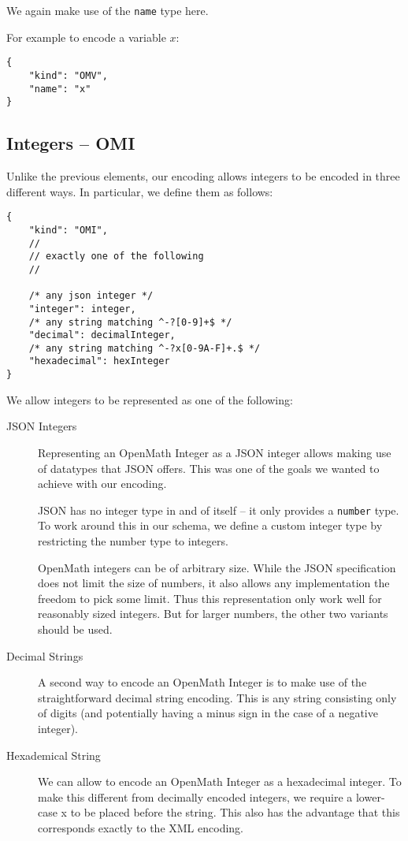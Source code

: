 We again make use of the \texttt{name} type here. 

For example to encode a variable $x$:
\\\begin{minipage}{\linewidth}
\begin{lstlisting}
{
    "kind": "OMV",
    "name": "x"
}
\end{lstlisting}\end{minipage}

\subsection{Integers -- OMI}

Unlike the previous elements, our encoding allows integers to be encoded in three different ways. 
In particular, we define them as follows:
\\\begin{minipage}{\linewidth}
\begin{lstlisting}
{
    "kind": "OMI",
    //
    // exactly one of the following
    //

    /* any json integer */
    "integer": integer,
    /* any string matching ^-?[0-9]+$ */
    "decimal": decimalInteger,
    /* any string matching ^-?x[0-9A-F]+.$ */
    "hexadecimal": hexInteger
}
\end{lstlisting}\end{minipage}

We allow integers to be represented as one of the following:
\begin{description}
    \item[JSON Integers]
    Representing an OpenMath Integer as a JSON integer allows making use of datatypes that JSON offers. 
    This was one of the goals we wanted to achieve with our encoding. 
    
    JSON has no integer type in and of itself -- it only provides a \texttt{number} type. 
    To work around this in our schema, we define a custom integer type by restricting the number type to integers. 

    OpenMath integers can be of arbitrary size. 
    While the JSON specification does not limit the size of numbers, it also allows any implementation the freedom to pick some limit. 
    Thus this representation only work well for reasonably sized integers. 
    But for larger numbers, the other two variants should be used. 

    \item[Decimal Strings]
    A second way to encode an OpenMath Integer is to make use of the straightforward decimal string encoding. 
    This is any string consisting only of digits (and potentially having a minus sign in the case of a negative integer). 

    \item[Hexademical String]
    We can allow to encode an OpenMath Integer as a hexadecimal integer. 
    To make this different from decimally encoded integers, we require a lower-case x to be placed before the string. 
    This also has the advantage that this corresponds exactly to the XML encoding.     
\end{description}

